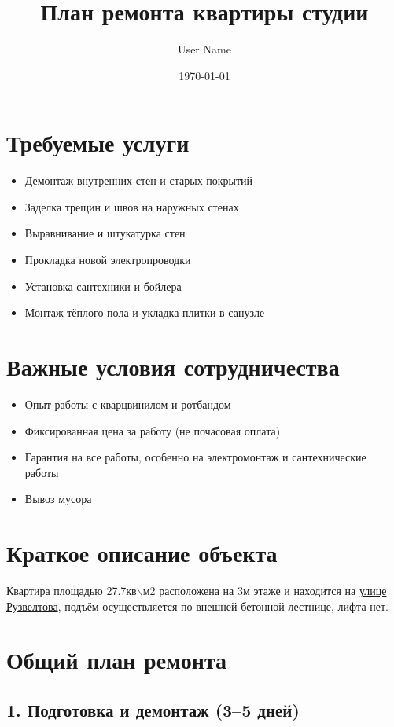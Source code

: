 \documentclass[11pt]{article}
\author{User Name}
\date{\today}
\title{План ремонта квартиры студии}
\begin{document}
\maketitle
\tableofcontents

\section{Требуемые услуги}
\label{sec:org014a268}

\begin{itemize}
\item Демонтаж внутренних стен и старых покрытий
\item Заделка трещин и швов на наружных стенах
\item Выравнивание и штукатурка стен
\item Прокладка новой электропроводки
\item Установка сантехники и бойлера
\item Монтаж тёплого пола и укладка плитки в санузле
\end{itemize}
\section{Важные условия сотрудничества}
\label{sec:org930081e}

\begin{itemize}
\item Опыт работы с кварцвинилом и ротбандом
\item Фиксированная цена за работу (не почасовая оплата)
\item Гарантия на все работы, особенно на электромонтаж и сантехнические работы
\item Вывоз мусора
\end{itemize}
\section{Краткое описание объекта}
\label{sec:org82de5c0}

Квартира площадью 27.7кв$\backslash$м2 расположена на 3м этаже и находится на \href{https://maps.app.goo.gl/fHZNWoGEtHksWi3w8}{улице Рузвелтова}, подъём осуществляется по внешней бетонной лестнице, лифта нет.
\section{Общий план ремонта}
\label{sec:org8523778}

\subsection{1. Подготовка и демонтаж (3–5 дней)}
\label{sec:org99d6cda}
\end{document}
